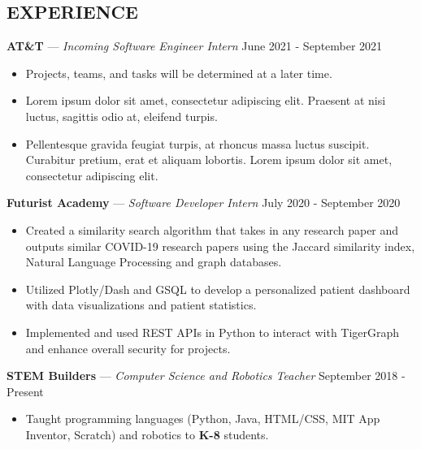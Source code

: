 \documentclass[11pt]{res}
\begin{document}
\begin{footnotesize}
\begin{resume}
\begin{small}
\section{EXPERIENCE}
\end{small}
\vspace{.5mm}
\textbf{AT\&T} — {\sl Incoming Software Engineer Intern} \hfill June 2021 - September 2021\vspace{-4.5mm}
\begin{itemize}[leftmargin=6.25mm] \itemsep -2pt 
\item Projects, teams, and tasks will be determined at a later time. 
\vspace{1.30mm}
\item Lorem ipsum dolor sit amet, consectetur adipiscing elit. Praesent at nisi luctus, sagittis odio at, eleifend turpis.
\vspace{1.30mm}
\item Pellentesque gravida feugiat turpis, at rhoncus massa luctus suscipit. Curabitur pretium, erat et aliquam lobortis. Lorem ipsum dolor sit amet, consectetur adipiscing elit.
\end{itemize}
\vspace{-2.5mm}
\textbf{Futurist Academy} — {\sl Software Developer Intern} \hfill July 2020 - September 2020\vspace{-4.5mm}
\begin{itemize}[leftmargin=6.25mm] \itemsep -2pt 
\item  Created a similarity search algorithm that takes in any research paper and outputs similar COVID-19 research papers using the Jaccard similarity index, Natural Language Processing and graph databases.
\vspace{1.30mm}
\item Utilized Plotly/Dash and GSQL to develop a personalized patient dashboard with data visualizations and patient statistics.
\vspace{1.30mm}
\item Implemented and used REST APIs in Python to interact with TigerGraph and enhance overall security for projects.
\end{itemize}
\vspace{-2.5mm}
\textbf{STEM Builders} — {\sl Computer Science and Robotics Teacher} \hfill September 2018 - Present\vspace{-4.5mm}
\begin{itemize}[leftmargin=6.25mm] \itemsep -2pt 
\item Taught programming languages (Python, Java, HTML/CSS, MIT App Inventor, Scratch) and robotics to \textbf{K-8} students. 

\end{itemize}
\end{resume}
\end{footnotesize}
\end{document}
